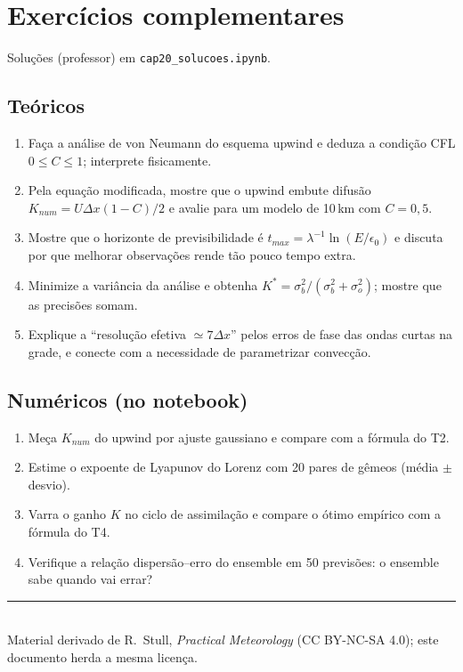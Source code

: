 \documentclass[11pt]{article}
\begin{document}
\section{Exercícios complementares}\label{sec:exercicios}

Soluções (professor) em \texttt{cap20\_solucoes.ipynb}.

\subsection*{Teóricos}

\begin{enumerate}[label=\textbf{T\arabic*.},itemsep=4pt]
  \item Faça a análise de von Neumann do esquema upwind e deduza a
        condição CFL $0 \le C \le 1$; interprete fisicamente.
  \item Pela equação modificada, mostre que o upwind embute difusão
        $K_{num} = U\Delta x(1-C)/2$ e avalie para um modelo de
        10\,km com $C = 0{,}5$.
  \item Mostre que o horizonte de previsibilidade é
        $t_{max} = \lambda^{-1}\ln(E/\epsilon_0)$ e discuta por que
        melhorar observações rende tão pouco tempo extra.
  \item Minimize a variância da análise e obtenha
        $K^* = \sigma_b^2/(\sigma_b^2+\sigma_o^2)$; mostre que as
        precisões somam.
  \item Explique a ``resolução efetiva $\simeq 7\Delta x$'' pelos
        erros de fase das ondas curtas na grade, e conecte com a
        necessidade de parametrizar convecção.
\end{enumerate}

\subsection*{Numéricos (no notebook)}

\begin{enumerate}[label=\textbf{N\arabic*.},itemsep=4pt]
  \item Meça $K_{num}$ do upwind por ajuste gaussiano e compare com a
        fórmula do T2.
  \item Estime o expoente de Lyapunov do Lorenz com 20 pares de
        gêmeos (média $\pm$ desvio).
  \item Varra o ganho $K$ no ciclo de assimilação e compare o ótimo
        empírico com a fórmula do T4.
  \item Verifique a relação dispersão--erro do ensemble em 50
        previsões: o ensemble sabe quando vai errar?
\end{enumerate}

\vspace{1em}
\noindent\rule{\linewidth}{0.4pt}\\
{\scriptsize Material derivado de R.~Stull, \emph{Practical Meteorology}
(CC BY-NC-SA 4.0); este documento herda a mesma licença.}
\end{document}
